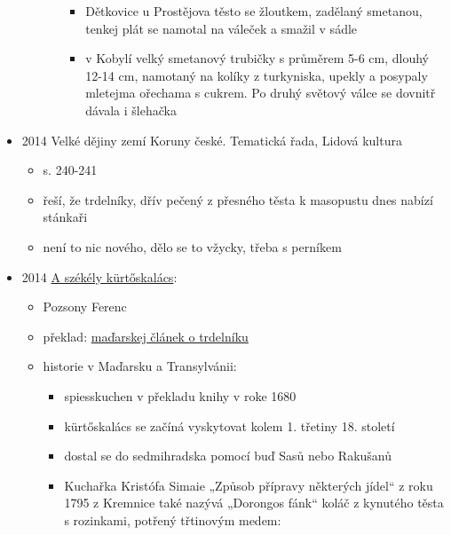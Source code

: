 \begin{itemize}
\begin{itemize}
\begin{itemize}
      \begin{itemize}
      \tightlist
      \item
        Dětkovice u Prostějova těsto se žloutkem, zadělaný smetanou,
        tenkej plát se namotal na váleček a smažil v sádle
      \item
        v Kobylí velký smetanový trubičky s průměrem 5-6 cm, dlouhý
        12-14 cm, namotaný na kolíky z turkyniska, upekly a posypaly
        mletejma ořechama s cukrem. Po druhý světový válce se dovnitř
        dávala i šlehačka
      \end{itemize}
    \end{itemize}
  \end{itemize}
\item
  2014 Velké dějiny zemí Koruny české. Tematická řada, Lidová kultura

  \begin{itemize}
  \tightlist
  \item
    s. 240-241
  \item
    řeší, že trdelníky, dřív pečený z přesného těsta k masopustu dnes
    nabízí stánkaři
  \item
    není to nic nového, dělo se to vžycky, třeba s perníkem
  \end{itemize}
\item
  2014
  \href{https://epa.oszk.hu/03300/03308/00007/pdf/EPA03308_acta_siculica_2014-2015_497_518.pdf}{A
  székély kürtőskalács}:

  \begin{itemize}
  \tightlist
  \item
    Pozsony Ferenc
  \item
    překlad: \hyperref[250319-1326]{maďarskej článek o trdelníku}
  \item
    historie v Maďarsku a Transylvánii:

    \begin{itemize}
    \tightlist
    \item
      spiesskuchen v překladu knihy v roke 1680
    \item
      kürtőskalács se začíná vyskytovat kolem 1. třetiny 18. století
    \item
      dostal se do sedmihradska pomocí buď Sasů nebo Rakušanů
    \item
      Kuchařka Kristófa Simaie „Způsob přípravy některých jídel`` z roku
      1795 z Kremnice také nazývá „Dorongos fánk`` koláč z kynutého
      těsta s rozinkami, potřený třtinovým medem:


\end{itemize}
\end{itemize}
\end{itemize}
